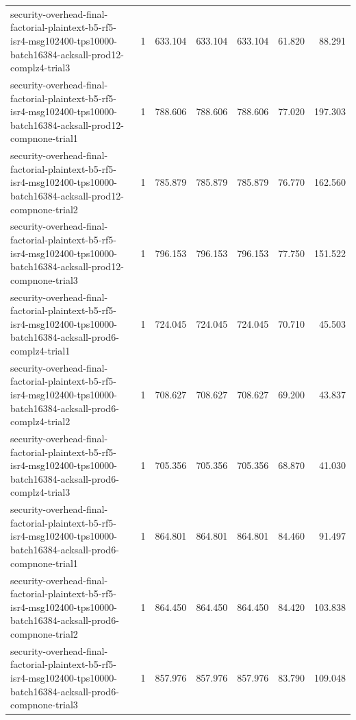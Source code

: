\begin{tabular}{lrrrrrr}
security-overhead-final-factorial-plaintext-b5-rf5-isr4-msg102400-tps10000-batch16384-acksall-prod12-complz4-trial3 & 1 & 633.104 & 633.104 & 633.104 & 61.820 & 88.291 \\
security-overhead-final-factorial-plaintext-b5-rf5-isr4-msg102400-tps10000-batch16384-acksall-prod12-compnone-trial1 & 1 & 788.606 & 788.606 & 788.606 & 77.020 & 197.303 \\
security-overhead-final-factorial-plaintext-b5-rf5-isr4-msg102400-tps10000-batch16384-acksall-prod12-compnone-trial2 & 1 & 785.879 & 785.879 & 785.879 & 76.770 & 162.560 \\
security-overhead-final-factorial-plaintext-b5-rf5-isr4-msg102400-tps10000-batch16384-acksall-prod12-compnone-trial3 & 1 & 796.153 & 796.153 & 796.153 & 77.750 & 151.522 \\
security-overhead-final-factorial-plaintext-b5-rf5-isr4-msg102400-tps10000-batch16384-acksall-prod6-complz4-trial1 & 1 & 724.045 & 724.045 & 724.045 & 70.710 & 45.503 \\
security-overhead-final-factorial-plaintext-b5-rf5-isr4-msg102400-tps10000-batch16384-acksall-prod6-complz4-trial2 & 1 & 708.627 & 708.627 & 708.627 & 69.200 & 43.837 \\
security-overhead-final-factorial-plaintext-b5-rf5-isr4-msg102400-tps10000-batch16384-acksall-prod6-complz4-trial3 & 1 & 705.356 & 705.356 & 705.356 & 68.870 & 41.030 \\
security-overhead-final-factorial-plaintext-b5-rf5-isr4-msg102400-tps10000-batch16384-acksall-prod6-compnone-trial1 & 1 & 864.801 & 864.801 & 864.801 & 84.460 & 91.497 \\
security-overhead-final-factorial-plaintext-b5-rf5-isr4-msg102400-tps10000-batch16384-acksall-prod6-compnone-trial2 & 1 & 864.450 & 864.450 & 864.450 & 84.420 & 103.838 \\
security-overhead-final-factorial-plaintext-b5-rf5-isr4-msg102400-tps10000-batch16384-acksall-prod6-compnone-trial3 & 1 & 857.976 & 857.976 & 857.976 & 83.790 & 109.048 \\
\hline
\end{tabular}
